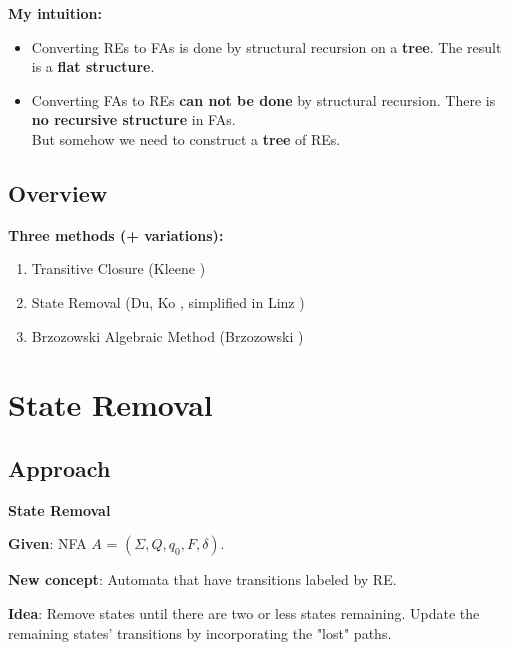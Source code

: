 \documentclass{beamer}
\begin{document}
\begin{frame}
    \textbf{My intuition:} 
    \begin{itemize}
        \item
            Converting REs to FAs is done by structural recursion on a \textbf{tree}. The result is a \textbf{flat structure}.

            \pause

        \item
            Converting FAs to REs \textbf{can not be done} by structural recursion.
            There is \textbf{no recursive structure} in FAs. \\
            But somehow we need to construct a \textbf{tree} of REs.
    \end{itemize}



\end{frame}

\subsection*{Overview}
\begin{frame}

    \textbf{Three methods (+ variations):}

    \begin{enumerate}
        \item Transitive Closure (Kleene \cite{KleeneNets})
        \item State Removal (Du, Ko \cite{DuKo}, simplified in Linz \cite{DBLP:books/daglib/0019552})
        \item Brzozowski Algebraic Method (Brzozowski \cite{DBLP:journals/jacm/Brzozowski64})
    \end{enumerate}

\end{frame}


\section{State Removal}
\subsection*{Approach}
\begin{frame}
    \textbf{State Removal}    

    \textbf{Given}: NFA $A$ = $(\Sigma, Q, q_0, F, \delta)$.

    \textbf{New concept}: Automata that have transitions labeled by RE.

    \textbf{Idea}: Remove states until there are two or less states remaining. Update the remaining states' transitions by incorporating the "lost" paths.


\end{frame}
\end{document}
